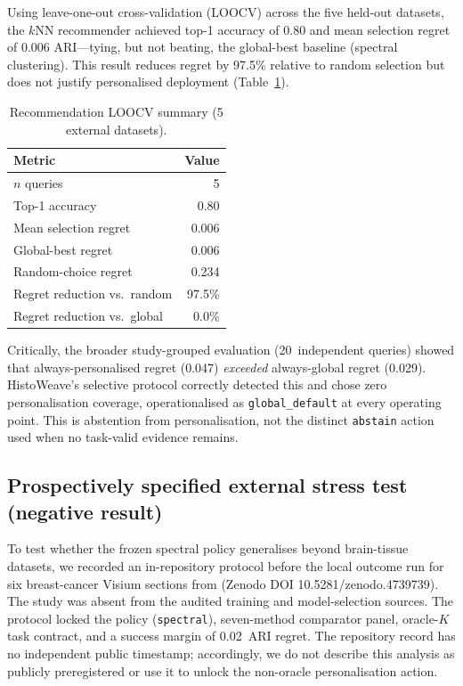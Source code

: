 \documentclass[]{bioinfo}
\begin{document}
Using leave-one-out cross-validation (LOOCV) across the five held-out
datasets, the $k$NN recommender achieved top-1 accuracy of 0.80 and mean
selection regret of 0.006 ARI---tying, but not beating, the global-best
baseline (spectral clustering). This result reduces regret by 97.5\%
relative to random selection but does not justify personalised deployment
(Table~\ref{tab:loocv}).

\begin{table}[!t]
\procemark
\caption{Recommendation LOOCV summary (5 external
datasets).\label{tab:loocv}}
\begin{tabular}{@{}lr@{}}
\toprule
Metric & Value \\
\midrule
$n$ queries & 5 \\
Top-1 accuracy & 0.80 \\
Mean selection regret & 0.006 \\
Global-best regret & 0.006 \\
Random-choice regret & 0.234 \\
Regret reduction vs.\ random & 97.5\% \\
Regret reduction vs.\ global & 0.0\% \\
\bottomrule
\end{tabular}
\end{table}

Critically, the broader study-grouped evaluation (20~independent
queries) showed that always-personalised regret (0.047) \emph{exceeded}
always-global regret (0.029). HistoWeave's selective protocol correctly
detected this and chose zero personalisation coverage, operationalised as
\texttt{global\_default} at every operating point. This is abstention
from personalisation, not the distinct \texttt{abstain} action used when
no task-valid evidence remains.

\subsection{Prospectively specified external stress test (negative result)}
\label{sec:independent-test}

To test whether the frozen spectral policy generalises beyond
brain-tissue datasets, we recorded an in-repository protocol before the
local outcome run for six breast-cancer Visium sections from
\citet{wu2021} (Zenodo DOI 10.5281/zenodo.4739739). The study was absent
from the audited training and model-selection sources. The protocol
locked the policy (\texttt{spectral}), seven-method comparator panel,
oracle-\(K\) task contract, and a success margin of 0.02~ARI regret.
The repository record has no independent public timestamp; accordingly,
we do not describe this analysis as publicly preregistered or use it to
unlock the non-oracle personalisation action.
\end{document}
